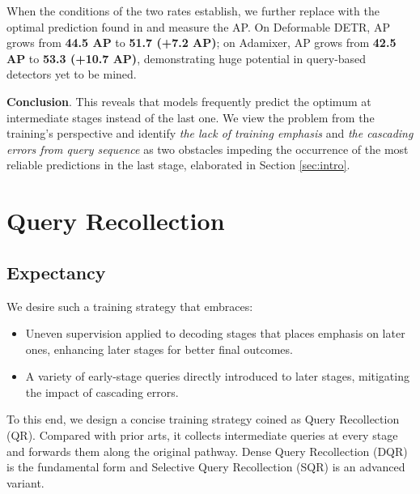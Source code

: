 \documentclass[10pt,twocolumn,letterpaper]{article}
\begin{document}
When the conditions of the two rates establish, we further replace  with the optimal prediction found in  and measure the AP. On Deformable DETR, AP grows from \textbf{44.5 AP} to \textbf{51.7 (+7.2 AP)}; on Adamixer, AP grows from \textbf{42.5 AP} to \textbf{53.3 (+10.7 AP)}, demonstrating huge potential in query-based detectors yet to be mined.  

\textbf{Conclusion}. This reveals that models frequently predict the optimum at intermediate stages instead of the last one. We view the problem from the training's perspective and identify \textit{the lack of training emphasis} and \textit{the cascading errors from query sequence} as two obstacles impeding the occurrence of the most reliable predictions in the last stage, elaborated in Section \ref{sec:intro}.

















\section{Query Recollection}
\label{sec:QR}

\subsection{Expectancy}
We desire such a training strategy that embraces:
\begin{itemize}
    \item Uneven supervision applied to decoding stages that places emphasis on later ones, enhancing later stages for better final outcomes.
    \item A variety of early-stage queries directly introduced to later stages, mitigating the impact of cascading errors.
\end{itemize}



To this end, we design a concise training strategy coined as Query Recollection (QR). Compared with prior arts, it collects intermediate queries at every stage and forwards them along the original pathway. Dense Query Recollection (DQR) is the fundamental form and Selective Query Recollection (SQR) is an advanced variant. 
\end{document}

